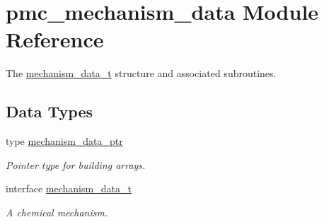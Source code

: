 \hypertarget{namespacepmc__mechanism__data}{}\section{pmc\+\_\+mechanism\+\_\+data Module Reference}
\label{namespacepmc__mechanism__data}


The \mbox{\hyperlink{structpmc__mechanism__data_1_1mechanism__data__t}{mechanism\+\_\+data\+\_\+t}} structure and associated subroutines.  


\subsection*{Data Types}
\begin{DoxyCompactItemize}
\item 
type \mbox{\hyperlink{structpmc__mechanism__data_1_1mechanism__data__ptr}{mechanism\+\_\+data\+\_\+ptr}}
\begin{DoxyCompactList}\small\item\em Pointer type for building arrays. \end{DoxyCompactList}\item 
interface \mbox{\hyperlink{structpmc__mechanism__data_1_1mechanism__data__t}{mechanism\+\_\+data\+\_\+t}}
\begin{DoxyCompactList}\small\item\em A chemical mechanism. \end{DoxyCompactList}\end{DoxyCompactItemize}
